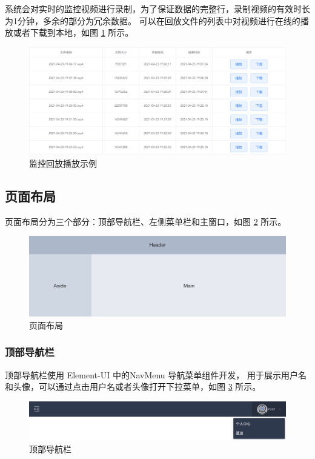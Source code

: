 系统会对实时的监控视频进行录制，为了保证数据的完整行，录制视频的有效时长为1分钟，多余的部分为冗余数据。
可以在回放文件的列表中对视频进行在线的播放或者下载到本地，如图 \ref{Fig:file_list} 所示。

\begin{figure}[ht]
    \centering
    \includegraphics[width=0.9\linewidth]{./Figure/IMG_file_list.png}
    \caption{监控回放播放示例}\label{Fig:file_list}
\end{figure}

\subsection{页面布局}
页面布局分为三个部分：顶部导航栏、左侧菜单栏和主窗口，如图 \ref{Fig:layout} 所示。

\begin{figure}[ht]
    \centering
    \includegraphics[width=0.9\linewidth]{./Figure/IMG_layout.png}
    \caption{页面布局}\label{Fig:layout}
\end{figure}

\subsubsection{顶部导航栏}
顶部导航栏使用 Element-UI 中的NavMenu 导航菜单组件开发，
用于展示用户名和头像，可以通过点击用户名或者头像打开下拉菜单，如图 \ref{Fig:top} 所示。

\begin{figure}[ht]
    \centering
    \includegraphics[width=0.9\linewidth]{./Figure/IMG_top.png}
    \caption{顶部导航栏}\label{Fig:top}
\end{figure}

